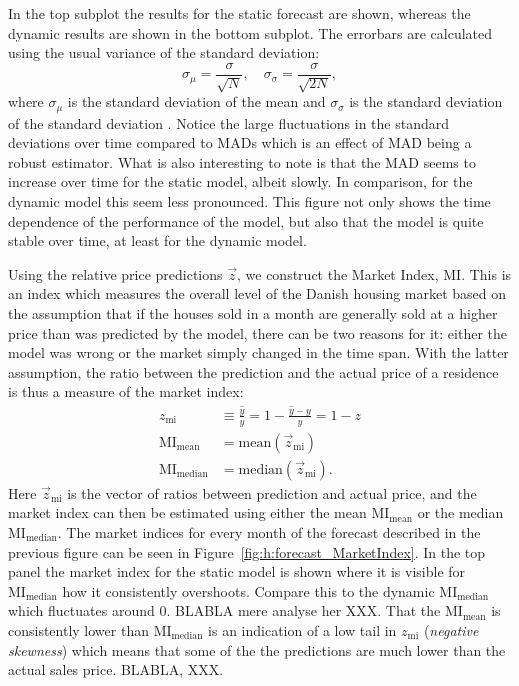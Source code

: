 In the top subplot the results for the static forecast are shown, whereas the dynamic results are shown in the bottom subplot. The errorbars are calculated using the usual variance of the standard deviation:
\begin{equation}
  \sigma_\mu  = \frac{\sigma}{\sqrt{N}}, \quad \sigma_\sigma = \frac{\sigma}{\sqrt{2N}},
\end{equation}
where $\sigma_\mu$ is the standard deviation of the mean and $\sigma_\sigma$ is the standard deviation of the standard deviation \autocite{Barlow:0471922951}.
Notice the large fluctuations in the standard deviations over time compared to MADs which is an effect of MAD being a robust estimator. What is also interesting to note is that the MAD seems to increase over time for the static model, albeit slowly. In comparison, for the dynamic model this seem less pronounced. This figure not only shows the time dependence of the performance of the model, but also that the model is quite stable over time, at least for the dynamic model. 

Using the relative price predictions $\vec{z}$, we construct the Market Index, $\mathrm{MI}$. This is an index which measures the overall level of the Danish housing market based on the assumption that if the houses sold in a month are generally sold at a higher price than was predicted by the model, there can be two reasons for it: either the model was wrong or the market simply changed in the time span. With the latter assumption, the ratio between the prediction and the actual price of a residence is thus a measure of the market index:
\begin{equation}
  \begin{split}
    z_\mathrm{mi} &\equiv \frac{\hat{y}}{y} = 1 - \frac{\hat{y}-y}{y}  = 1-z \\
    \mathrm{MI}_\mathrm{mean} &= \mathrm{mean}(\vec{z}_\mathrm{mi}) \\
    \mathrm{MI}_\mathrm{median} &= \mathrm{median}(\vec{z}_\mathrm{mi}).
    \label{eq:h:market_index}
  \end{split}
\end{equation}
Here $\vec{z}_\mathrm{mi}$ is the vector of ratios between prediction and actual price, and the market index can then be estimated using either the mean $\mathrm{MI}_\mathrm{mean}$ or the median $\mathrm{MI}_\mathrm{median}$. The market indices for every month of the forecast described in the previous figure can be seen in Figure~\ref{fig:h:forecast_MarketIndex}. In the top panel the market index for the static model is shown where it is visible for $\mathrm{MI}_\mathrm{median}$ how it consistently overshoots. Compare this to the dynamic $\mathrm{MI}_\mathrm{median}$ which fluctuates around \num{0}. BLABLA mere analyse her XXX. That the $\mathrm{MI}_\mathrm{mean}$ is consistently lower than $\mathrm{MI}_\mathrm{median}$ is an indication of a low tail in $z_\mathrm{mi}$ (\emph{negative skewness}) which means that some of the the predictions are much lower than the actual sales price. BLABLA, XXX. \TODO

